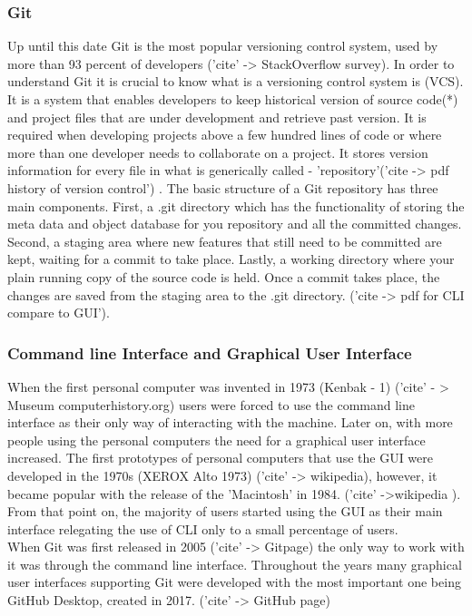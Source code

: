 \documentclass[]{report}
\begin{document}
	\subsubsection{Git}
	Up until this date Git is the most popular versioning control system, used by more than 93 percent of developers ('cite' -> StackOverflow survey). In order to understand Git it is crucial to know what is a versioning control system is (VCS). It is a system that enables developers to keep historical version of source code(*) and project files that are under development and retrieve past version. It is required when developing projects above a few hundred lines of code or where more than one developer needs to collaborate on a project. It stores version information for every file in what is generically called - 'repository'('cite -> pdf history of version control') . The basic structure of a Git repository has three main components. First, a .git directory which has the functionality of storing the meta data and object database for you repository and all the committed changes. Second, a staging area where new features that still need to be committed are kept, waiting for a commit to take place. Lastly, a working directory where your plain running copy of the source code is held. Once a commit takes place, the changes are saved from the staging area to the .git directory. ('cite -> pdf for CLI compare to GUI').
	
	\subsubsection{Command line Interface and Graphical User Interface}
	When the first personal computer was invented in 1973 (Kenbak - 1) ('cite' - > Museum computerhistory.org) users were forced to use the command line interface as their only way of interacting with the machine. Later on, with more people using the personal computers the need for a graphical user interface increased. The first prototypes of personal computers that use the GUI were developed in the 1970s (XEROX Alto 1973) ('cite' -> wikipedia), however, it became popular with the release of the 'Macintosh' in 1984. ('cite' ->wikipedia ). From that point on, the majority of users started using the GUI as their main interface relegating the use of CLI only to a small percentage of users.\\
	When Git was first released in 2005 ('cite' -> Gitpage) the only way to work with it was through the command line interface. Throughout the years many graphical user interfaces supporting Git were developed with the most important one being GitHub Desktop, created in 2017. ('cite' -> GitHub page)
	
\end{document}
